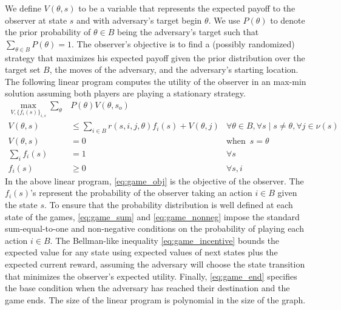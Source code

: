 We define $V(\theta, s)$ to be a variable that represents 
the expected payoff to the observer at state $s$ and with adversary's target begin $\theta$. 
We use $P(\theta)$ to denote the prior probability 
of $\theta \in B$ being the adversary's target such that $\sum_{\theta \in B} P(\theta) = 1$. 
The observer's objective is to find a (possibly randomized) strategy 
that maximizes his expected payoff given the prior distribution over the target set $B$, 
the moves of the adversary, and the adversary's starting location. 
The following linear program computes the utility of the observer in an max-min solution
assuming both players are playing a stationary strategy. 
\begin{align}
\!\!\!\!\max_{V, \{f_i(s)\}_{i,s}} \sum_{\theta}&P(\theta)V(\theta, s_{o}) \label{eq:game_obj}\\
V(\theta, s) &\leq \sum_{i \in B} r(s, i, j, \theta)f_{i}(s) + V(\theta, j) &\forall\theta\in B,\forall s \mid s\neq \theta, \forall j\in\nu(s)\label{eq:game_incentive}\\
V(\theta, s) &= 0 \quad &\mbox{when} \,\,\, s=\theta\label{eq:game_end}\\
\sum_{i} f_{i}(s) &= 1\quad &\forall s \label{eq:game_sum}\\
f_{i}(s) &\geq 0\quad &\forall s,i\label{eq:game_nonneg}
\end{align}
In the above linear program, \eqref{eq:game_obj} is the objective of the observer. 
The $f_{i}(s)$'s represent the probability of the observer taking an action $i \in B$ given the state $s$. 
To ensure that the probability distribution is well defined at each state of the games,
\eqref{eq:game_sum} and \eqref{eq:game_nonneg} impose the standard sum-equal-to-one and non-negative conditions on the probability of playing 
each action $i \in B$. The Bellman-like inequality \eqref{eq:game_incentive}
bounds the expected value for any state using 
expected values of next states plus the expected current reward, assuming the adversary will choose
the state transition that minimizes the observer's expected utility.
Finally, \eqref{eq:game_end} specifies the base condition when the adversary has reached their destination and the game ends. 
The size of the linear program is polynomial in the size of the graph. 

